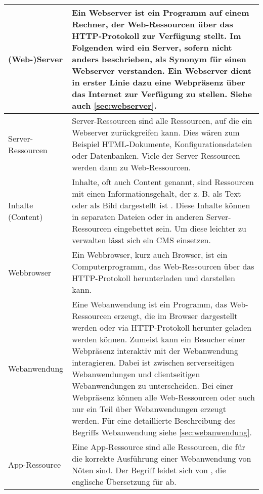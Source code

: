 \begin{longtable}{| p{} | p{} |}
	(Web-)Server\index{Webserver} & Ein Webserver ist ein Programm auf einem Rechner, der Web-Ressourcen über das HTTP-Protokoll zur Verfügung stellt. Im Folgenden wird ein Server, sofern nicht anders beschrieben, als Synonym für einen Webserver verstanden. Ein Webserver dient in erster Linie dazu eine Webpräsenz über das Internet zur Verfügung zu stellen. Siehe auch \autoref{sec:webserver}.
	\\
	\hline
	
	Server-Ressourcen\index{Ressource!Server-Ressource} & Server-Ressourcen sind alle Ressourcen, auf die ein Webserver zurückgreifen kann. Dies wären zum Beispiel HTML-Dokumente, Konfigurationsdateien oder Datenbanken. Viele der Server-Ressourcen werden dann zu Web-Ressourcen. \\
	\hline
	
	Inhalte (Content)\index{Content} & Inhalte, oft auch Content genannt, sind Ressourcen mit einen Informationsgehalt, der z. B. als Text oder als Bild dargestellt ist \cite[S. 239]{MorvilleRosenfeld2006}. Diese Inhalte können in separaten Dateien oder in anderen Server-Ressourcen eingebettet sein. Um diese leichter zu verwalten lässt sich ein CMS einsetzen.\\
	\hline
	
	Webbrowser \index{Webbrowser}\index{Browser|see{Webbrowser}}& Ein Webbrowser, kurz auch Browser, ist ein Computerprogramm, das Web-Ressourcen über das HTTP-Protokoll herunterladen und darstellen kann.\\
	\hline
	
	Webanwendung \index{Webanwendung}& Eine Webanwendung ist ein Programm, das Web-Ressourcen erzeugt, die im Browser dargestellt werden oder via HTTP-Protokoll herunter geladen werden können. Zumeist kann ein Besucher einer Webpräsenz interaktiv mit der Webanwendung interagieren. 
	Dabei ist zwischen serverseitigen Webanwendungen und clientseitigen Webanwendungen zu unterscheiden.
	Bei einer Webpräsenz können alle Web-Ressourcen oder auch nur ein Teil über Webanwendungen erzeugt werden. Für eine detaillierte Beschreibung des Begriffs Webanwendung siehe \autoref{sec:webanwendung}. 
	\\
	\hline
	App-Ressource \index{Ressource!App-Ressource}& Eine App-Ressource sind alle Ressourcen, die für die korrekte Ausführung einer Webanwendung von Nöten sind. Der Begriff \quotes{App} leidet sich von \quotes{Applikation}, die englische Übersetzung für \quotes{Anwendung} ab. 
	\\
	\hline
	

\end{longtable}
